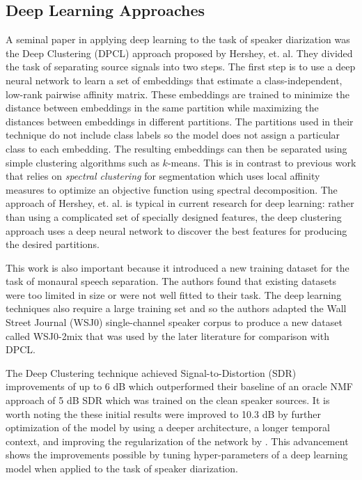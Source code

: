 \documentclass[journal, a4paper]{IEEEtran}
\begin{document}
\subsection{Deep Learning Approaches}

A seminal paper in applying deep learning to the task of speaker diarization was the Deep Clustering (DPCL) \cite{DBLP:journals/corr/HersheyCRW15} approach proposed by Hershey, et. al. They divided the task of separating source signals into two steps. The first step is to use a deep neural network to learn a set of embeddings that estimate a class-independent, low-rank pairwise affinity matrix. These embeddings are trained to minimize the distance between embeddings in the same partition while maximizing the distances between embeddings in different partitions. The partitions used in their technique do not include class labels so the model does not assign a particular class to each embedding. The resulting embeddings can then be separated using simple clustering algorithms such as $k$-means. This is in contrast to previous work that relies on \textit{spectral clustering} for segmentation which uses local affinity measures to optimize an objective function using spectral decomposition. The approach of Hershey, et. al. is typical in current research for deep learning: rather than using a complicated set of specially designed features, the deep clustering approach uses a deep neural network to discover the best features for producing the desired partitions.

This work is also important because it introduced a new training dataset for the task of monaural speech separation. The authors found that existing datasets were too limited in size or were not well fitted to their task. The deep learning techniques also require a large training set and so the authors adapted the Wall Street Journal (WSJ0) \cite{WSJintro} single-channel speaker corpus to produce a new dataset called WSJ0-2mix \cite{WSJmix} that was used by the later literature for comparison with DPCL.

The Deep Clustering technique achieved Signal-to-Distortion (SDR) improvements of up to 6 dB which outperformed their baseline of an oracle NMF approach of 5 dB SDR which was trained on the clean speaker sources. It is worth noting the these initial results were improved to 10.3 dB by further optimization of the model by using a deeper architecture, a longer temporal context, and improving the regularization of the network by \cite{DBLP:journals/corr/IsikRCWH16}. This advancement shows the improvements possible by tuning hyper-parameters of a deep learning model when applied to the task of speaker diarization.
\end{document}
